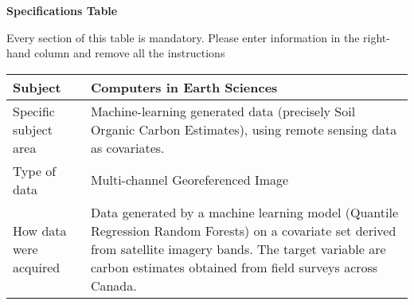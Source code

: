 \documentclass[times,final]{elsarticle}
\begin{document}


{\fontsize{7.5pt}{9pt}\selectfont
\noindent\textbf{Specifications Table} 

Every section of this table is mandatory. 
Please enter information in the right-hand column and remove all the instructions
\begin{longtable}{|p{33mm}|p{94mm}|}
\hline
\endhead
\hline
\endfoot
Subject                & Computers in Earth Sciences\\
\hline                         
Specific subject area  & Machine-learning generated data (precisely Soil Organic Carbon Estimates), using remote sensing data as covariates.\\
\hline
Type of data           & Multi-channel Georeferenced Image \newline \\             
\newline                  
How data were acquired & Data generated by a machine learning model (Quantile                                Regression Random Forests) on a covariate set derived from                           satellite imagery bands. The target variable are carbon                              estimates obtained from field surveys across Canada. \\ 


\end{longtable}}
\end{document}
